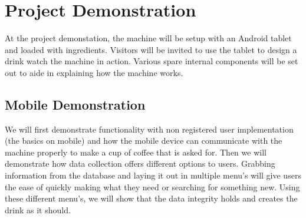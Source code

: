 \documentclass[conference]{IEEEtran}
\begin{document}
\section{Project Demonstration}
At the project demonstation, the machine will be setup with an Android tablet and loaded with ingredients.
Visitors will be invited to use the tablet to design a drink watch the machine in action. Various spare internal components
will be set out to aide in explaining how the machine works.

\subsection{Mobile Demonstration}
We will first demonstrate functionality with non registered user implementation (the basics on mobile)
 and how the mobile device can communicate with the machine properly to make a cup of coffee that is
  asked for. Then we will demonstrate how data collection offers different options to users. Grabbing 
  information from the database and laying it out in multiple menu's will give users the ease of quickly 
  making what they need or searching for something new. Using these different menu's, we will show 
  that the data integrity holds and creates the drink as it should. 
 

% 
% 

{}

\end{document}
